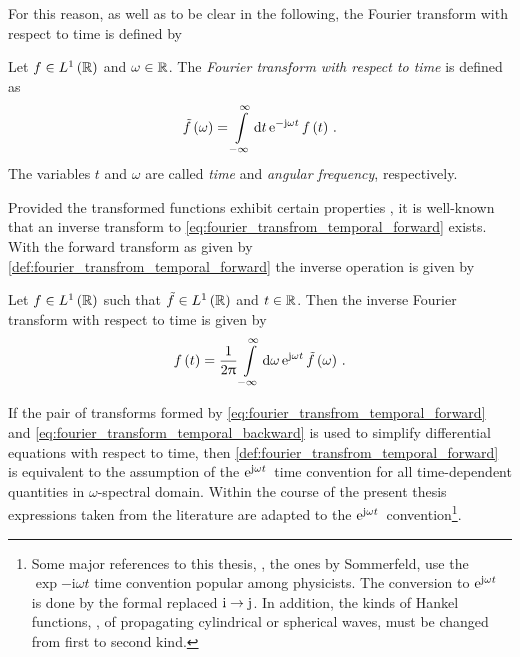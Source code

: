 For this reason, as well as to be clear in the following, the Fourier transform
with respect to time is defined by
\begin{definition}
	\label{def:fourier_transfrom_temporal_forward}
	Let $f \in L^1\left( \mathbb{R} \right)$ and $\omega \in \mathbb{R}$.
	The \emph{Fourier transform with respect to time} is defined as 
	\begin{equation}\label{eq:fourier_transfrom_temporal_forward}
		\tilde{f} \left( \omega \right) =
		\int\limits_{-\infty}^{\infty} \mathrm{d} t \,
		\mathrm{e}^{-\mathrm{j} \omega t}\, 
		f\left( t \right) \, .
	\end{equation}
	The variables $t$ and $\omega$ are called \emph{time} and \emph{angular
	frequency}, respectively.
\end{definition}
Provided the transformed functions exhibit certain properties
\cite{heuser2006, strichartz2003}, it is well-known that an inverse
transform to \eqref{eq:fourier_transfrom_temporal_forward} exists.
With the forward transform as given by
\cref{def:fourier_transfrom_temporal_forward} the inverse operation is given by
\begin{lemma}
	Let $f \in L^1 \left(\mathbb{R}\right)$ such that
	$\tilde{f} \in L^1 \left(\mathbb{R}\right)$ and $t \in \mathbb{R}$. Then the
	inverse Fourier transform with respect to time is given by
	\begin{equation}\label{eq:fourier_transform_temporal_backward}
		f \left( t \right) =
		\frac{1}{2\uppi}
		\int\limits_{-\infty}^{\infty} \mathrm{d} \omega \,
		\mathrm{e}^{\mathrm{j} \omega t}\, 
		\tilde{f} \left( \omega \right) \, .
	\end{equation}
\end{lemma}

\begin{remark}\label{rem:time_convention}
	If the pair of transforms formed by
	\eqref{eq:fourier_transfrom_temporal_forward} and
	\eqref{eq:fourier_transform_temporal_backward} is used to simplify
	differential equations with respect to time, then
	\cref{def:fourier_transfrom_temporal_forward} is equivalent to the
	assumption of the $\mathrm{e}^{\mathrm{j} \omega t}\,$ time convention for all
	time-dependent quantities in $\omega$-spectral domain.
	Within the course of the present thesis expressions taken from the
	literature are adapted to the $\mathrm{e}^{\mathrm{j} \omega t}\,$ convention\footnote{
		Some major references to this thesis, \eg, the ones by Sommerfeld, 
		use the $\exp{-\mathrm{i} \omega t}$ time convention popular among
		physicists. The conversion to $\mathrm{e}^{\mathrm{j} \omega t}\,$ is done by the
		formal replaced $\mathrm{i} \to \mathrm{j}$. In addition, the kinds of
		Hankel functions, \ie, of propagating cylindrical or spherical waves,
		must be changed from first to second kind.
	}.
\end{remark}

